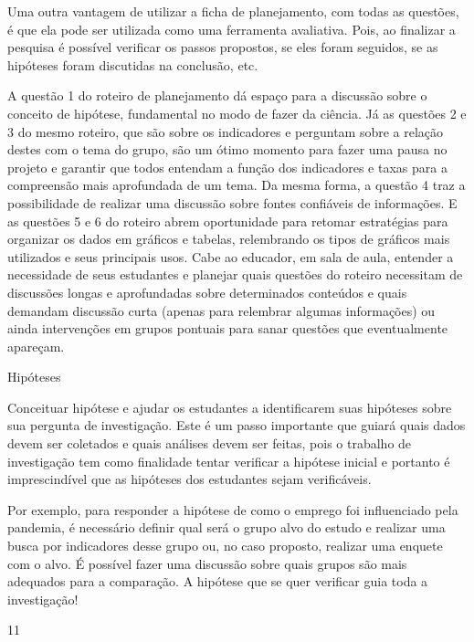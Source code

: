 \begin{paginatexto}
Uma outra vantagem de utilizar a ficha de planejamento, com todas as questões, é que ela pode ser utilizada como uma ferramenta avaliativa. Pois, ao finalizar a pesquisa é possível verificar os passos propostos, se eles foram seguidos, se as hipóteses foram discutidas na conclusão, etc. 

A questão 1 do roteiro de planejamento dá espaço para a discussão sobre o conceito de hipótese, fundamental no modo de fazer da ciência. Já as questões 2 e 3 do mesmo roteiro, que são sobre os indicadores e perguntam sobre a relação destes com o tema do grupo, são um ótimo momento para fazer uma pausa no projeto e garantir que todos entendam a função dos indicadores e taxas para a compreensão mais aprofundada de um tema. Da mesma forma, a questão 4 traz a possibilidade de realizar uma discussão sobre fontes confiáveis de informações. E as questões 5 e 6 do roteiro abrem oportunidade para retomar estratégias para organizar os dados em gráficos e tabelas, relembrando os tipos de gráficos mais utilizados e seus principais usos. Cabe ao educador, em sala de aula, entender a necessidade de seus estudantes e planejar quais questões do roteiro necessitam de discussões longas e aprofundadas sobre determinados conteúdos e quais demandam discussão curta (apenas para relembrar algumas informações) ou ainda intervenções em grupos pontuais para sanar questões que eventualmente apareçam.

\end{paginatexto}

\def\currentcolor{session4}


\begin{objectives}{Hipóteses}
{
Conceituar hipótese e ajudar os estudantes a identificarem suas hipóteses sobre sua pergunta de investigação. Este é um passo importante que guiará quais dados devem ser coletados e quais análises devem ser feitas, pois o trabalho de investigação tem como finalidade tentar verificar a hipótese inicial e portanto é imprescindível que as hipóteses dos estudantes sejam verificáveis. 

Por exemplo, para responder a hipótese de como o emprego foi influenciado pela pandemia, é necessário definir qual será o grupo alvo do estudo e realizar uma busca por indicadores desse grupo ou, no caso proposto, realizar uma enquete com o alvo. É possível fazer uma discussão sobre quais grupos são mais adequados para a comparação. A hipótese que se quer verificar guia toda a investigação!
}{1}{1}
\end{objectives}



